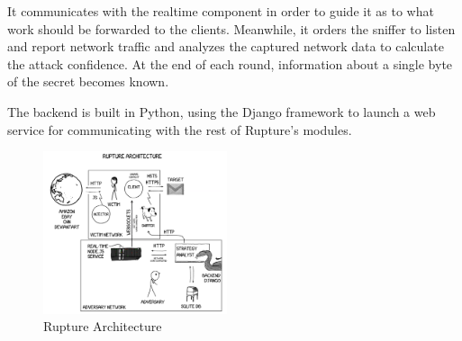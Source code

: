 It communicates with the realtime component in order to guide it as to
what work should be forwarded to the clients. Meanwhile, it orders the sniffer
to listen and report network traffic and analyzes the captured network data to
calculate the attack confidence. At the end of each
round, information about a single byte of the secret becomes known.

The backend is built in Python, using the Django framework to launch a web
service for communicating with the rest of Rupture's modules.

   \begin{figure}[thpb]
      \centering
          \includegraphics[width=0.48\textwidth]{figures/architecture.png}
      \caption{Rupture Architecture}
   \end{figure}
